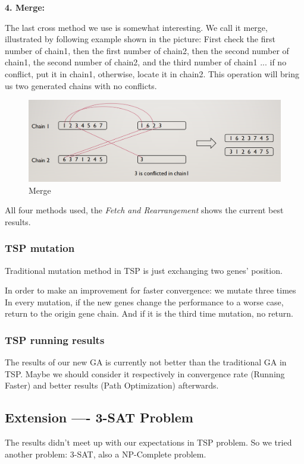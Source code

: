 \documentclass{acmtog} %
\begin{document}
{\bfseries 4. Merge:}

The last cross method we use is somewhat interesting. We call it merge, illustrated by following example shown in the picture: First check the first number of chain1, then the first number of chain2, then the second number of chain1, the second number of chain2, and the third number of chain1 ... if no conflict, put it in chain1, otherwise, locate it in chain2. This operation will bring us two generated chains with no conflicts.

\begin{figure}[ht]
\centering
\includegraphics[scale=0.35]{6}
\caption{Merge}
\label{fig:label}
\end{figure}

All four methods used, the \emph{Fetch and Rearrangement} shows the current best results.

\subsubsection{TSP mutation}
\label{subsubsec:tspmutation}
\qquad

Traditional mutation method in TSP is just exchanging two genes' position.

In order to make an improvement for faster convergence: we mutate three times
In every mutation, if the new genes change the performance to a worse case, return to the origin gene chain. And if it is the third time mutation, no return.


\subsubsection{TSP running results}
\label{subsubsec:tspresults}
\qquad

The results of our new GA is currently not better than the traditional GA in TSP. Maybe we should consider it respectively in convergence rate (Running Faster) and better results (Path Optimization) afterwards.

\subsection{Extension ---- 3-SAT Problem}
\label{subsec:3sat}
The results didn't meet up with our expectations in TSP problem. So we tried another problem: 3-SAT, also a NP-Complete problem.
\end{document}
